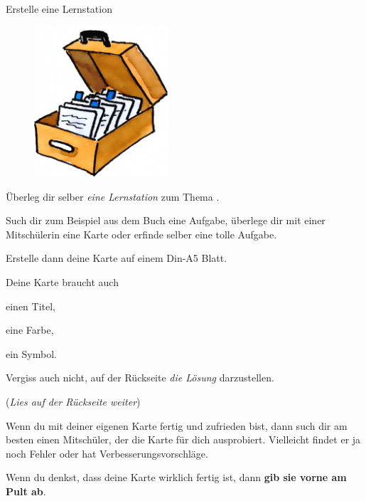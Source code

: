 \documentclass[12pt,a5paper,landscape]{scrartcl}
\begin{document}
	\begin{karte3}[\symPartner]{Erstelle eine Lernstation}
		\bigskip

		\begin{figure}
			\includegraphics[width=5cm]{6.2-LT-Abb_Kartei}
		\end{figure}
		Überleg dir selber \emph{eine Lernstation} zum Thema \emph{\Titel}.

		Such dir zum Beispiel aus dem Buch eine Aufgabe, überlege dir mit einer Mitschülerin eine Karte oder erfinde selber eine tolle Aufgabe.

		Erstelle dann deine Karte auf einem Din-A5 Blatt.

		Deine Karte braucht auch
		\begin{smallitemize}
			\item einen Titel,
			\item eine Farbe,
			\item ein Symbol.
		\end{smallitemize}

		Vergiss auch nicht, auf der Rückseite \emph{die Lösung} darzustellen.

		\bigskip
		(\textit{Lies auf der Rückseite weiter})

	\end{karte3}

	\begin{loesungskarte}
		Wenn du mit deiner eigenen Karte fertig und zufrieden bist, dann such dir am besten einen Mitschüler, der die Karte für dich ausprobiert. Vielleicht findet er ja noch Fehler oder hat Verbesserungsvorschläge.

		\bigskip
		Wenn du denkst, dass deine Karte wirklich fertig ist, dann \textbf{gib sie vorne am Pult ab}.
	\end{loesungskarte}
\end{document}
